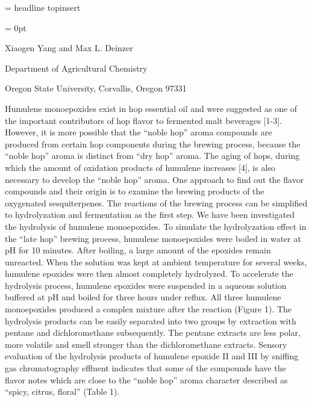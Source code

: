 

\headline = {headline\hfil}
\topinsert
topinsert
\endinsert

\parskip = 0pt

\centerline{Xiaogen Yang and Max L. Deinzer}
\smallskip
\centerline{Department of Agricultural Chemistry}
\centerline{Oregon State University, Corvallis, Oregon 97331}

\doublecolumns
Humulene monoepoxides exist in hop essential oil and were suggested
as one of the important contributors of hop flavor to fermented
malt beverages [1-3]. However, it is more possible that the ``noble
hop'' aroma compounds are produced from certain hop components
during the brewing process, because the ``noble hop'' aroma is
distinct from ``dry hop'' aroma. The aging of hops, during which the
amount of oxidation products of humulene increases [4], is also
necessary to develop the ``noble hop'' aroma. One approach to find
out the flavor compounds and their origin is to examine the brewing
products of the oxygenated sesquiterpenes. The reactions of the
brewing process can be simplified to hydrolyzation and fermentation
as the first step. We have been investigated the hydrolysis of
humulene monoepoxides.
\singlecolumn
To simulate the hydrolyzation effect in the ``late hop'' brewing
process, humulene monoepoxides were boiled in water at
pH for 10 minutes. After boiling, a large amount of
the epoxides remain unreacted. When the solution was kept at
ambient temperature for several weeks, humulene epoxides were
then almost completely hydrolyzed. To accelerate the hydrolysis
process, humulene epoxides were suspended in a aqueous solution
buffered at pH and boiled for three hours under
reflux. All three humulene monoepoxides produced a complex
mixture after the reaction (Figure 1). The hydrolysis products
can be easily separated into two groups by extraction with
pentane and dichloro\-me\-thane subsequently. The pentane
extracts are less polar, more volatile and smell stron\-ger than
the dichloro\-methane extracts. Sensory evaluation of the
hydrolysis products of humulene epoxide II and III by sniffing
gas chromatography effluent indicates that some of the compounds
have the flavor notes which are close to the ``noble hop'' aroma
character described as ``spicy, citrus, floral'' (Table 1).

\bye

